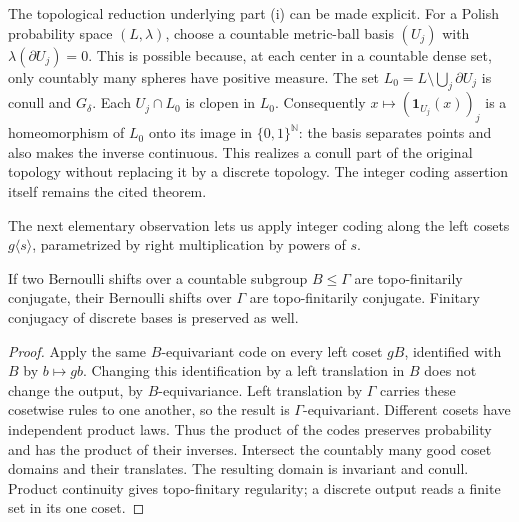 \documentclass[11pt,a4paper]{article}
\numberwithin{equation}{section}
\newcommand{\NN}{\mathbb N}
\begin{document}
\begin{remark}
The topological reduction underlying part (i) can be made explicit.
For a Polish probability space $(L,\lambda)$, choose a countable
metric-ball basis $(U_j)$ with $\lambda(\partial U_j)=0$.
This is possible because, at each center in a countable dense set,
only countably many spheres have positive measure.
The set $L_0=L\setminus\bigcup_j\partial U_j$ is conull and $G_\delta$.
Each $U_j\cap L_0$ is clopen in $L_0$. Consequently
$x\mapsto(\mathbf1_{U_j}(x))_j$ is a homeomorphism of $L_0$ onto
its image in $\{0,1\}^{\NN}$: the basis separates points and also
makes the inverse continuous. This realizes a conull part of the
original topology without replacing it by a discrete topology.
The integer coding assertion itself remains the cited theorem.
\end{remark}

The next elementary observation lets us apply integer coding along
the left cosets $g\langle s\rangle$, parametrized by right multiplication
by powers of $s$.

\begin{lemma}\label{lem:coinduce}
If two Bernoulli shifts over a countable subgroup $B\leq\Gamma$
are topo-finitarily conjugate, their Bernoulli shifts over $\Gamma$
are topo-finitarily conjugate. Finitary conjugacy of discrete bases
is preserved as well.
\end{lemma}
\begin{proof}
Apply the same $B$-equivariant code on every left coset $gB$,
identified with $B$ by $b\mapsto gb$. Changing this identification
by a left translation in $B$ does not change the output, by
$B$-equivariance. Left translation by $\Gamma$ carries these
cosetwise rules to one another, so the result is $\Gamma$-equivariant.
Different cosets have independent product laws. Thus the product of
the codes preserves probability and has the product of their inverses.
Intersect the countably many good coset domains and their translates.
The resulting domain is invariant and conull. Product continuity
gives topo-finitary regularity; a discrete output reads a finite
set in its one coset.
\end{proof}
\end{document}
